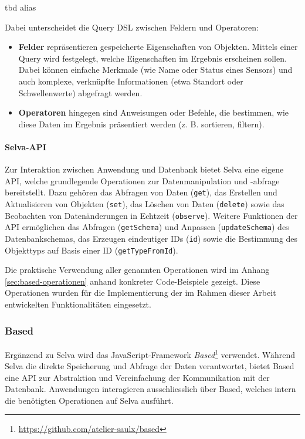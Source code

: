 tbd alias 


Dabei unterscheidet die Query DSL zwischen Feldern und Operatoren:

\begin{itemize} \item \textbf{Felder} repräsentieren gespeicherte Eigenschaften von Objekten. Mittels einer Query wird festgelegt, welche Eigenschaften im Ergebnis erscheinen sollen. Dabei können einfache Merkmale (wie Name oder Status eines Sensors) und auch komplexe, verknüpfte Informationen (etwa Standort oder Schwellenwerte) abgefragt werden.

\item \textbf{Operatoren} hingegen sind Anweisungen oder Befehle, die bestimmen, wie diese Daten im Ergebnis präsentiert werden (z. B. sortieren, filtern).
\end{itemize}

\paragraph{Selva-API}
Zur Interaktion zwischen Anwendung und Datenbank bietet Selva eine eigene API, welche grundlegende Operationen zur Datenmanipulation und -abfrage bereitstellt. Dazu gehören das Abfragen von Daten (\texttt{get}), das Erstellen und Aktualisieren von Objekten (\texttt{set}), das Löschen von Daten (\texttt{delete}) sowie das Beobachten von Datenänderungen in Echtzeit (\texttt{observe}). Weitere Funktionen der API ermöglichen das Abfragen (\texttt{getSchema}) und Anpassen (\texttt{updateSchema}) des Datenbankschemas, das Erzeugen eindeutiger IDs (\texttt{id}) sowie die Bestimmung des Objekttyps auf Basis einer ID (\texttt{getTypeFromId}).

Die praktische Verwendung aller genannten Operationen wird im Anhang \ref{sec:based-operationen} anhand konkreter Code-Beispiele gezeigt. Diese Operationen wurden für die Implementierung der im Rahmen dieser Arbeit entwickelten Funktionalitäten eingesetzt.

\subsubsection{Based}
Ergänzend zu Selva wird das JavaScript-Framework \textit{Based}\footnote{\url{https://github.com/atelier-saulx/based}} verwendet. Während Selva die direkte Speicherung und Abfrage der Daten verantwortet, bietet Based eine API zur Abstraktion und Vereinfachung der Kommunikation mit der Datenbank. Anwendungen interagieren ausschliesslich über Based, welches intern die benötigten Operationen auf Selva ausführt.

